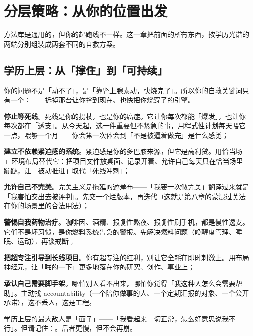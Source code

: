 \section{分层策略：从你的位置出发}

方法库是通用的，但你的起跑线不一样。这一章把前面的所有东西，按学历光谱的两端分别组装成两套不同的自救方案。

\subsection{学历上层：从「撑住」到「可持续」}

你的问题不是「动不了」，是「靠肾上腺素动，快烧完了」。所以你的自救关键词只有一个：——拆掉那台让你撑到现在、也快把你烧穿了的引擎。

\begin{checklist}
  \item \textbf{停止等死线}。死线是你的拐杖，也是你的癌症。它让你每次都能「爆发」，也让你每次都在「透支」。从今天起，选一件重要但不紧急的事，用程式性计划每天喂它一点，喂够一个月——你会第一次体会到「不是被逼着做完」是什么感觉；
  \item \textbf{建立不依赖紧迫感的系统}。紧迫感是你的多巴胺来源，但它是高利贷。用恰当场 + 环境布局替代它：把项目文件放桌面、记录开着、允许自己每天只在恰当场里蹦跶，让「被动推进」取代「死线冲刺」；
  \item \textbf{允许自己不完美}。完美主义是拖延的遮羞布——「我要一次做完美」翻译过来就是「我害怕交出去被评判」。先交一个烂版本，再迭代（这就是第八章的蒙混过关法在你的场景里的合法用法）；
  \item \textbf{警惕自我药物治疗}。咖啡因、酒精、报复性熬夜、报复性刷手机，都是慢性透支。它们不是坏习惯，是你燃料系统告急的警报。先解决燃料问题（唤醒度管理、睡眠、运动），再谈戒断；
  \item \textbf{把超专注引导到长线项目}。你有超专注的红利，别让它全耗在即时刺激上。用布局神经元，让「啪的一下」更多地落在你的研究、创作、事业上；
  \item \textbf{承认自己需要脚手架}。哪怕别人看不出来，哪怕你觉得「我这种人怎么会需要帮助」。主动找 accountability（一个陪你做事的人、一个定期汇报的对象、一个公开承诺），这不丢人，这是工程。
\end{checklist}

\begin{insight}
学历上层的最大敌人是「面子」——「我看起来一切正常，怎么好意思说我不行」。但请记住：。后者更慢，但不会再崩。
\end{insight}

